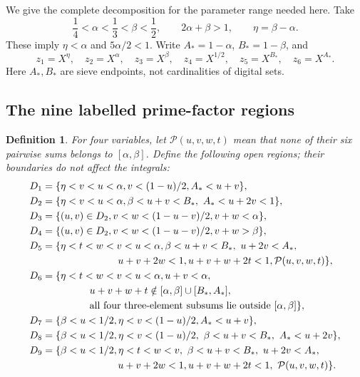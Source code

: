 \documentclass[11pt,a4paper]{article}
\theoremstyle{paperplain}
\newtheorem{definition}[theorem]{Definition}
\numberwithin{equation}{section}
\begin{document}
We give the complete decomposition for the parameter range needed here.
Take
\begin{equation}\label{sieve:parameters}
 \frac14<\alpha<\frac13<\beta<\frac12,
 \qquad 2\alpha+\beta>1,
 \qquad \eta=\beta-\alpha.
\end{equation}
These imply $\eta<\alpha$ and $5\alpha/2<1$.
Write $A_*=1-\alpha$, $B_*=1-\beta$, and
\[
 z_1=X^\eta,\quad z_2=X^\alpha,\quad z_3=X^\beta,
 \quad z_4=X^{1/2},\quad z_5=X^{B_*},\quad z_6=X^{A_*}.
\]
Here $A_*,B_*$ are sieve endpoints, not cardinalities of digital sets.

\subsection{The nine labelled prime-factor regions}

\begin{definition}\label{sieve:domains}
For four variables, let $\mathcal P(u,v,w,t)$ mean that none of their
six pairwise sums belongs to $[\alpha,\beta]$.
Define the following open regions; their boundaries do not affect
the integrals:
\begin{align*}
 D_1={}&\{\eta<v<u<\alpha, v<(1-u)/2, A_*<u+v\},\\
 D_2={}&\{\eta<v<u<\alpha, \beta<u+v<B_*,\ A_*<u+2v<1\},\\
 D_3={}&\{(u,v)\in D_2, v<w<(1-u-v)/2, v+w<\alpha\},\\
 D_4={}&\{(u,v)\in D_2, v<w<(1-u-v)/2, v+w>\beta\},\\
 D_5={}&\{\eta<t<w<v<u<\alpha, \beta<u+v<B_*,\ u+2v<A_*,\\
       &\hspace{22mm}u+v+2w<1, u+v+w+2t<1, \mathcal P(u,v,w,t)\},\\
 D_6={}&\{\eta<t<w<v<u<\alpha, u+v<\alpha,\\
       &\hspace{12mm}u+v+w+t\notin[\alpha,\beta]\cup[B_*,A_*],\\
       &\hspace{12mm}\hbox{all four three-element subsums lie outside }[\alpha,\beta]\},\\
 D_7={}&\{\beta<u<1/2, \eta<v<(1-u)/2, A_*<u+v\},\\
 D_8={}&\{\beta<u<1/2, \eta<v<(1-u)/2,\ \beta<u+v<B_*,\ A_*<u+2v\},\\
 D_9={}&\{\beta<u<1/2, \eta<t<w<v,\ \beta<u+v<B_*,\ u+2v<A_*,\\
       &\hspace{22mm}u+v+2w<1, u+v+w+2t<1,\ \mathcal P(u,v,w,t)\}.
\end{align*}
\end{definition}
\end{document}

